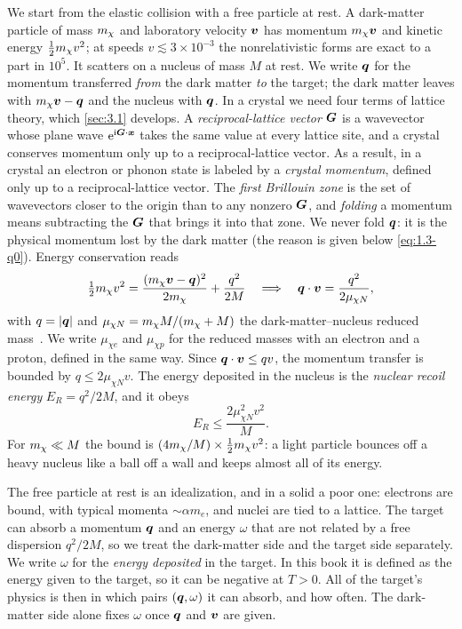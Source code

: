 We start from the elastic collision with a free particle at rest. A dark-matter particle of mass $m_{\chi}$ and laboratory velocity $\bm{v}$ has momentum $m_{\chi}\bm{v}$ and kinetic energy $\tfrac12m_{\chi} v^2$; at speeds $v \lesssim 3\times10^{-3}$ the nonrelativistic forms are exact to a part in $10^5$. It scatters on a nucleus of mass $M$ at rest. We write $\bm{q}$ for the momentum transferred \emph{from} the dark matter \emph{to} the target; the dark matter leaves with $m_{\chi}\bm{v} - \bm{q}$ and the nucleus with $\bm{q}$. In a crystal we need four terms of lattice theory, which \cref{sec:3.1} develops. A \emph{reciprocal-lattice vector} $\bm{G}$ is a wavevector whose plane wave $\mathrm{e}^{\mathrm{i}\bm{G}\cdot\bm{x}}$ takes the same value at every lattice site, and a crystal conserves momentum only up to a reciprocal-lattice vector. As a result, in a crystal an electron or phonon state is labeled by a \emph{crystal momentum}, defined only up to a reciprocal-lattice vector. The \emph{first Brillouin zone} is the set of wavevectors closer to the origin than to any nonzero $\bm{G}$, and \emph{folding} a momentum means subtracting the $\bm{G}$ that brings it into that zone. We never fold $\bm{q}$: it is the physical momentum lost by the dark matter (the reason is given below \cref{eq:1.3-q0}). Energy conservation reads
\begin{equation}
  \tfrac12m_{\chi} v^2 = \frac{(m_{\chi}\bm{v} - \bm{q})^2}{2m_{\chi}} + \frac{q^2}{2M}
  \quad\Longrightarrow\quad
  \bm{q}\cdot\bm{v} = \frac{q^2}{2\mu_{\chi N}},
  \label{eq:1.3-elastic}
\end{equation}
with $q = |\bm{q}|$ and $\mu_{\chi N} = m_{\chi} M/(m_{\chi} + M)$ the dark-matter--nucleus reduced mass~\cite[Eqs.~(75)--(77)]{lin2019tasi}. We write $\mu_{\chi e}$ and $\mu_{\chi p}$ for the reduced masses with an electron and a proton, defined in the same way. Since $\bm{q}\cdot\bm{v} \le qv$, the momentum transfer is bounded by $q \le 2\mu_{\chi N}v$. The energy deposited in the nucleus is the \emph{nuclear recoil energy} $E_R = q^2/2M$, and it obeys~\cite[Eq.~(78)]{lin2019tasi}
\begin{equation}
  E_R \le \frac{2\mu_{\chi N}^2 v^2}{M}.
  \label{eq:1.3-ERmax}
\end{equation}
For $m_{\chi} \ll M$ the bound is $(4m_{\chi}/M)\times\tfrac12m_{\chi} v^2$: a light particle bounces off a heavy nucleus like a ball off a wall and keeps almost all of its energy.

The free particle at rest is an idealization, and in a solid a poor one: electrons are bound, with typical momenta $\sim \alpha m_e$, and nuclei are tied to a lattice. The target can absorb a momentum $\bm{q}$ and an energy $\omega$ that are not related by a free dispersion $q^2/2M$, so we treat the dark-matter side and the target side separately. We write $\omega$ for the \emph{energy deposited} in the target. In this book it is defined as the energy given to the target, so it can be negative at $T > 0$. All of the target's physics is then in which pairs $(\bm{q}, \omega)$ it can absorb, and how often. The dark-matter side alone fixes $\omega$ once $\bm{q}$ and $\bm{v}$ are given.

